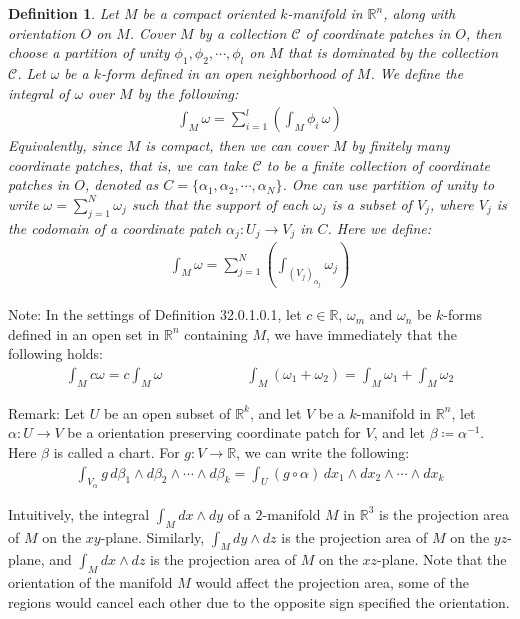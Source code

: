 \documentclass[15pt]{book}
\theoremstyle{break}
\theoremstyle{break}
\newtheorem{defn}{Definition}[corL]
\newcommand{\R}{\mathbb{R}}
\newcommand{\C}{\mathcal{C}}
\newcommand{\note}{\color{red}Note: \color{black}}
\newcommand{\remark}{\color{blue}Remark: \color{black}}
\begin{document}
\begin{defn}
Let $M$ be a compact oriented $k$-manifold in $\R^n$, along with orientation $O$ on $M$. Cover $M$ by a collection $\C$ of coordinate patches in $O$, then choose a partition of unity $\phi_{1},\phi_2,\cdots, \phi_l$ on $M$ that is dominated by the collection $\C$. Let $\omega$ be a $k$-form defined in an open neighborhood of $M$. We define the integral of $\omega$ over $M$ by the following:
\begin{align*}
\int_M \omega = \sum_{i=1}^l\left( \int_M\phi_i\, \omega\right)
\end{align*}
Equivalently, since $M$ is compact, then we can cover $M$ by finitely many coordinate patches, that is, we can take $\C$ to be a finite collection of coordinate patches in $O$, denoted as $C = \{ \alpha_1, \alpha_2,\cdots, \alpha_N\}$. One can use partition of unity to write $\omega = \sum_{j=1}^N\omega_j $ such that the support of each $\omega_j$ is a subset of $V_j$, where $V_j$ is the codomain of a coordinate patch $\alpha_j: U_j \to V_j$ in $C$. Here we define: 
\begin{align*}
\int_M \omega = \sum_{j=1}^N \left(\int_{(V_j)_{\alpha_j}}\omega_j \right)
\end{align*}
\end{defn}

\note In the settings of Definition 32.0.1.0.1, let $c \in \R$, $\omega_m$ and $\omega_n$ be $k$-forms defined in an open set in $\R^n$ containing $M$, we have immediately that the following holds:
\begin{align*}
\int_M c \omega = c \int_M \omega \qquad\qquad\qquad \int_M(\omega_1+\omega_2) = \int_M \omega_1 + \int_M \omega_2
\end{align*}


\remark Let $U$ be an open subset of $\R^k$, and let $V$ be a $k$-manifold in $\R^n$, let $\alpha:U \to V$ be a orientation preserving coordinate patch for $V$, and let $\beta \coloneqq \alpha^{-1}$. Here $\beta$ is called a chart. For $g :V \to \R$, we can write the following:
\begin{align*}
\int_{V_\alpha} g\, d\beta_1 \wedge d\beta_2 \wedge\cdots \wedge d\beta_k = \int_U (g\circ \alpha)\, dx_1\wedge dx_2 \wedge \cdots \wedge dx_k
\end{align*}

Intuitively, the integral $\int_M dx\wedge dy$ of a $2$-manifold $M$ in $\R^3$ is the projection area of $M$ on the $xy$-plane. Similarly, $\int_M dy\wedge dz$ is the projection area of $M$ on the $yz$-plane, and  $\int_M dx\wedge dz$ is the projection area of $M$ on the $xz$-plane. Note that the orientation of the manifold $M$ would affect the projection area, some of the regions would cancel each other due to the opposite sign specified the orientation.\\
 
\end{document}
